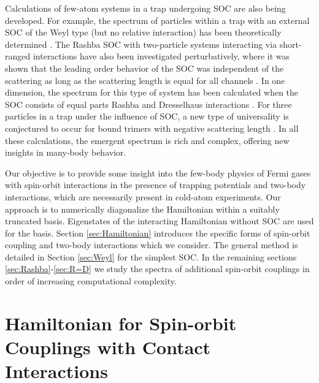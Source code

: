 \documentclass[%
 preprint,
 amsmath,amssymb,
 aps,
]{revtex4-1}
\begin{document}
Calculations of few-atom systems in a trap undergoing SOC are also being developed.  For example, the spectrum of particles within a trap with an external SOC of the Weyl type (but no relative interaction) has been theoretically determined \cite{anderson2013}. The Rashba SOC with two-particle systems interacting via short-ranged interactions have also been investigated perturbatively, where it was shown that the leading order behavior of the SOC was independent of the scattering as long as the scattering length is equal for all channels \cite{PhysRevA.89.033606}.  In one dimension, the spectrum for this type of system has been calculated when the SOC consists of equal parts Rashba and Dresselhaus interactions \cite{guan2014energy}.  For three particles in a trap under the influence of SOC, a new type of universality is conjectured to occur for bound trimers with negative scattering length \cite{PhysRevLett.112.013201}.  In all these calculations, the emergent spectrum is rich and complex, offering new insights in many-body behavior.

Our objective is to provide some insight into the few-body physics of Fermi gases with spin-orbit interactions in the presence of trapping potentials and two-body interactions, which are necessarily present in cold-atom experiments. Our approach is to numerically diagonalize the Hamiltonian within a suitably truncated basis. Eigenstates of the interacting Hamiltonian without SOC are used for the basis. Section \ref{sec:Hamiltonian} introduces the specific forms of spin-orbit coupling and two-body interactions which we consider. The general method is detailed in Section \ref{sec:Weyl} for the simplest SOC.  In the remaining sections \ref{sec:Rashba}-\ref{sec:R=D} we study the spectra of additional spin-orbit couplings in order of increasing computational complexity.

\section{\label{sec:Hamiltonian}Hamiltonian for Spin-orbit Couplings with Contact Interactions}
\end{document}
